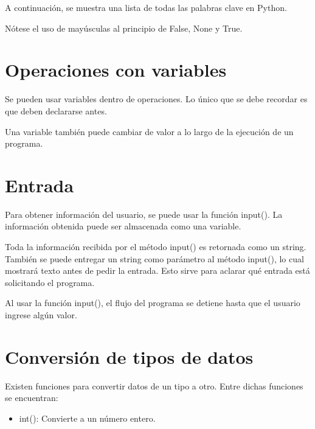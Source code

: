 \documentclass{report}
\begin{document}
{A continuación, se muestra una lista de todas las palabras clave en Python.


Nótese el uso de mayúsculas al principio de False, None y True.

\section{Operaciones con variables}

Se pueden usar variables dentro de operaciones. Lo único que se debe recordar es que deben declararse antes.


Una variable también puede cambiar de valor a lo largo de la ejecución de un programa.


\section{Entrada}

Para obtener información del usuario, se puede usar la función input(). La información obtenida puede ser almacenada como una variable.


Toda la información recibida por el método input() es retornada como un string.
También se puede entregar un string como parámetro al método input(), lo cual mostrará texto antes de pedir la entrada. Esto sirve para aclarar qué entrada está solicitando el programa.


Al usar la función input(), el flujo del programa se detiene hasta que el usuario ingrese algún valor.

\section{Conversión de tipos de datos}

Existen funciones para convertir datos de un tipo a otro. Entre dichas funciones se encuentran:

\begin{itemize}
  \item int(): Convierte a un número entero.
  


\end{itemize}}
\end{document}
